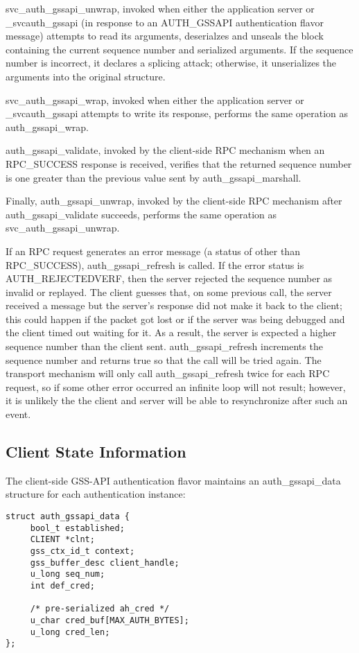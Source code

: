 svc_auth_gssapi_unwrap, invoked when either the application server or
_svcauth_gssapi (in response to an AUTH_GSSAPI authentication flavor
message) attempts to read its arguments, deserialzes and unseals the
block containing the current sequence number and serialized arguments.
If the sequence number is incorrect, it declares a splicing attack;
otherwise, it unserializes the arguments into the original structure.

svc_auth_gssapi_wrap, invoked when either the application server or
_svcauth_gssapi attempts to write its response, performs the same
operation as auth_gssapi_wrap.

auth_gssapi_validate, invoked by the client-side RPC mechanism when
an RPC_SUCCESS response is received, verifies that the returned sequence
number is one greater than the previous value sent by
auth_gssapi_marshall.

Finally, auth_gssapi_unwrap, invoked by the client-side RPC mechanism
after auth_gssapi_validate succeeds, performs the same operation as
svc_auth_gssapi_unwrap.

If an RPC request generates an error message (a status of other than
RPC_SUCCESS), auth_gssapi_refresh is called.  If the error status is
AUTH_REJECTEDVERF, then the server rejected the sequence number as
invalid or replayed.  The client guesses that, on some previous call,
the server received a message but the server's response did not make
it back to the client; this could happen if the packet got lost or if
the server was being debugged and the client timed out waiting for it.
As a result, the server is expected a higher sequence number than the
client sent.  auth_gssapi_refresh increments the sequence number and
returns true so that the call will be tried again.  The transport
mechanism will only call auth_gssapi_refresh twice for each RPC
request, so if some other error occurred an infinite loop will not
result; however, it is unlikely the the client and server will be able
to resynchronize after such an event.

\subsection{Client State Information}

The client-side GSS-API authentication flavor maintains an
auth_gssapi_data structure for each authentication instance:

\begin{verbatim}
struct auth_gssapi_data {
     bool_t established;
     CLIENT *clnt;
     gss_ctx_id_t context;
     gss_buffer_desc client_handle;
     u_long seq_num;
     int def_cred;

     /* pre-serialized ah_cred */
     u_char cred_buf[MAX_AUTH_BYTES];
     u_long cred_len;
};
\end{verbatim}

